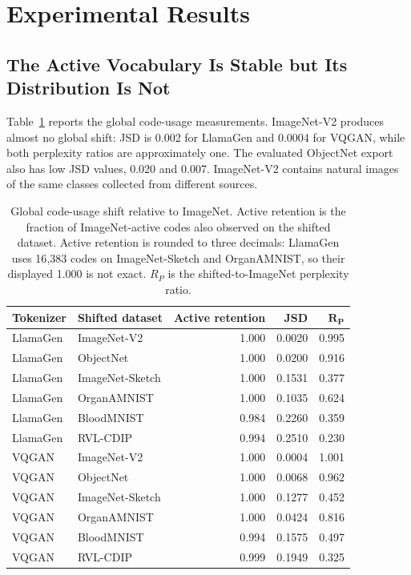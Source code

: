 \section{Experimental Results}
\label{sec:rq5_results}

\subsection{The Active Vocabulary Is Stable but Its Distribution Is Not}
\label{subsec:rq5_global_results}

Table~\ref{tab:rq5_global_shift} reports the global code-usage measurements.
ImageNet-V2 produces almost no global shift: JSD is 0.002 for LlamaGen and
0.0004 for VQGAN, while both perplexity ratios are approximately one.
The evaluated ObjectNet export also has low JSD values, 0.020 and 0.007.
ImageNet-V2 contains natural images of the same classes collected from
different sources.

\begin{table}[t]
    \centering
    \scriptsize
    \setlength{\tabcolsep}{4pt}
    \begin{tabular}{llrrr}
        \textbf{Tokenizer} & \textbf{Shifted dataset} & \textbf{Active retention} & \textbf{JSD} & $\boldsymbol{R_P}$ \\ \hline
        LlamaGen & ImageNet-V2     & 1.000 & 0.0020 & 0.995 \\
        LlamaGen & ObjectNet       & 1.000 & 0.0200 & 0.916 \\
        LlamaGen & ImageNet-Sketch & 1.000 & 0.1531 & 0.377 \\
        LlamaGen & OrganAMNIST     & 1.000 & 0.1035 & 0.624 \\
        LlamaGen & BloodMNIST      & 0.984 & 0.2260 & 0.359 \\
        LlamaGen & RVL-CDIP        & 0.994 & 0.2510 & 0.230 \\ \hline
        VQGAN & ImageNet-V2        & 1.000 & 0.0004 & 1.001 \\
        VQGAN & ObjectNet          & 1.000 & 0.0068 & 0.962 \\
        VQGAN & ImageNet-Sketch    & 1.000 & 0.1277 & 0.452 \\
        VQGAN & OrganAMNIST        & 1.000 & 0.0424 & 0.816 \\
        VQGAN & BloodMNIST         & 0.994 & 0.1575 & 0.497 \\
        VQGAN & RVL-CDIP           & 0.999 & 0.1949 & 0.325 \\
    \end{tabular}
    \caption{Global code-usage shift relative to ImageNet. Active retention is
    the fraction of ImageNet-active codes also observed on the shifted dataset.
    Active retention is rounded to three decimals: LlamaGen uses 16{,}383 codes on
    ImageNet-Sketch and OrganAMNIST, so their displayed 1.000 is not exact.
    $R_P$ is the shifted-to-ImageNet perplexity ratio.}
    \label{tab:rq5_global_shift}
\end{table}

